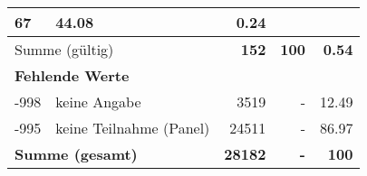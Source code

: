 \begin{longtable}{lXrrr}
       \num{67} &
       \num[round-mode=places,round-precision=2]{44.08} &
         \num[round-mode=places,round-precision=2]{0.24} \\
     \midrule
     \multicolumn{2}{l}{Summe (gültig)} &
       \textbf{\num{152}} &
     \textbf{\num{100}} &
       \textbf{\num[round-mode=places,round-precision=2]{0.54}} \\
     \multicolumn{5}{l}{\textbf{Fehlende Werte}}\\
       -998 &
       keine Angabe &
         \num{3519} &
        - &
         \num[round-mode=places,round-precision=2]{12.49} \\
       -995 &
       keine Teilnahme (Panel) &
         \num{24511} &
        - &
         \num[round-mode=places,round-precision=2]{86.97} \\
     \midrule
     \multicolumn{2}{l}{\textbf{Summe (gesamt)}} &
          \textbf{\num{28182}} &
        \textbf{-} &
        \textbf{\num{100}} \\
     \bottomrule
     \end{longtable}
     
